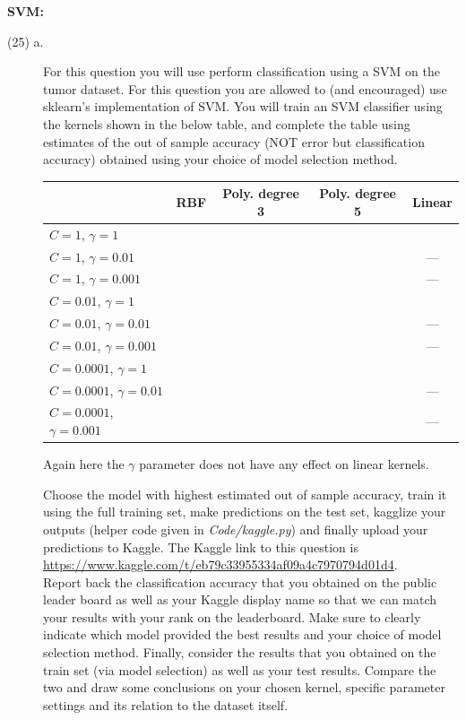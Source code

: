 \documentclass[11pt]{article}
\begin{document}
\begin{problem}{25}\textbf{SVM:}
\begin{description}
\item[(25) a.] For this question you will use perform classification using a SVM on the tumor dataset.
For this question you are allowed to (and encouraged) use sklearn's implementation of SVM.
You will train an SVM classifier using the kernels shown in the below table, and complete the table using estimates of the out of sample accuracy (NOT error but classification accuracy) obtained using your choice of model selection method.





\begin{table}[H]
\centering
\begin{tabular}{|l|c|c|c|c|}
\hline
                                    & RBF & Poly. degree 3 & Poly. degree 5 & Linear \\\hline
$C = 1$, $\gamma = 1$        &     &  &    &        \\\hline
$C = 1$, $\gamma = 0.01$          &     &  &    &  ---      \\\hline
$C = 1$, $\gamma = 0.001$      &     &  &    &  ---      \\\hline
$C = 0.01$, $\gamma = 1$   &     &    &  &        \\\hline
$C = 0.01$, $\gamma = 0.01$     &     &    &  &  ---      \\\hline
$C = 0.01$, $\gamma = 0.001$ &     &    &  &  ---      \\\hline
$C = 0.0001$, $\gamma = 1$ &     &  &    &        \\\hline
$C = 0.0001$, $\gamma = 0.01$ &     &  &    &    ---    \\\hline
$C = 0.0001$, $\gamma = 0.001$ &     &  &    &   ---     \\\hline
\end{tabular}
\end{table} 

Again here the $\gamma$ parameter does not have any effect on linear kernels.
\vspace{2mm}

Choose the model with highest estimated out of sample accuracy, train it using the full training set, make predictions on the test set, kagglize your outputs (helper code given in \textit{Code/kaggle.py}) and finally upload your predictions to Kaggle.
The Kaggle link to this question is\\
\url{https://www.kaggle.com/t/eb79c33955334af09a4c7970794d01d4}.\\
Report back the classification accuracy that you obtained on the public leader board as well as your Kaggle display name so that we can match your results with your rank on the leaderboard. Make sure to clearly indicate which model provided the best results and your choice of model selection method.
Finally, consider the results that you obtained on the train set (via model selection) as well as your test results.
Compare the two and draw some conclusions on your chosen kernel, specific parameter settings and its relation to the dataset itself.



\end{description}
\end{problem}
\end{document}
